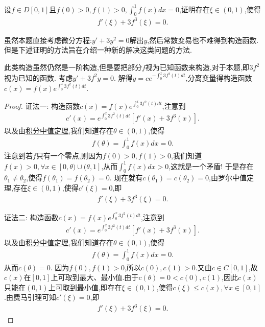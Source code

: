 \documentclass[../../main.tex]{subfiles}
\begin{document}
\begin{example}
设\(f\in D[0,1]\)且\(f(0)>0,f(1)>0,\int_{0}^{1} f(x)dx = 0\),证明存在\(\xi\in(0,1)\),使得
\begin{align*}
f'(\xi)+3f^{3}(\xi)=0.
\end{align*}
\end{example}
\begin{remark}
虽然本题直接考虑微分方程:$y'+3y^2=0$解出$y$,然后常数变易也不难得到构造函数.但是下述证明的方法旨在介绍一种新的解决这类问题的方法.
\end{remark}
\begin{note}
此类构造虽然仍然是一阶构造,但是要把部分\(f\)视为已知函数来构造,对于本题,即\(3f^{2}\)视为已知的函数. 考虑\(y'+3f^{2}y = 0\). 解得\(y = ce^{-\int_{0}^{x} 3f^{2}(t)dt}\),分离变量得构造函数\(c(x)=f(x)e^{\int_{0}^{x} 3f^{2}(t)dt}\).
\end{note}
\begin{proof}
{\color{blue}证法一:}
构造函数\(c(x)=f(x)e^{\int_{0}^{x} 3f^{2}(t)dt}\),注意到
\begin{align*}
c'(x)=e^{\int_{0}^{x} 3f^{2}(t)dt}[f'(x)+3f^{3}(x)].
\end{align*}
以及由\hyperref[theorem:积分中值定理]{积分中值定理},我们知道存在\(\theta\in(0,1)\),使得
\begin{align*}
f(\theta)=\int_{0}^{1} f(x)dx = 0.
\end{align*}
注意到若\(f\)只有一个零点,则因为\(f(0)>0,f(1)>0\),我们知道\(f(x)>0,\forall x\in[0,\theta)\cup(\theta,1]\),从而\(\int_{0}^{1} f(x)dx>0\),这就是一个矛盾!
于是存在\(\theta_1\neq\theta_2\),使得\(f(\theta_1)=f(\theta_2)=0\). 现在就有\(c(\theta_1)=c(\theta_2)=0\),由罗尔中值定理,存在\(\xi\in(0,1)\),使得\(c'(\xi)=0\),即
\begin{align*}
f'(\xi)+3f^{3}(\xi)=0.
\end{align*}

{\color{blue}证法二:}
构造函数\(c(x)=f(x)e^{\int_{0}^{x} 3f^{2}(t)dt}\),注意到
\begin{align*}
c'(x)=e^{\int_{0}^{x} 3f^{2}(t)dt}[f'(x)+3f^{3}(x)].
\end{align*}
以及由\hyperref[theorem:积分中值定理]{积分中值定理},我们知道存在\(\theta\in(0,1)\),使得
\begin{align*}
f(\theta)=\int_{0}^{1} f(x)dx = 0.
\end{align*}
从而$c(\theta)=0$.
因为$f(0),f(1)>0$,所以$c(0),c(1)>0$.又由$c\in C[0,1]$,故$c(x)$在$[0,1]$上可取到最大、最小值.由于$c(\theta)=0<c(0),c(1)$,因此$c(x)$只能在$(0,1)$上可取到最小值,即存在\(\xi\in(0,1)\),使得$c(\xi)\leq c(x),\forall x\in[0,1]$.由费马引理可知\(c'(\xi)=0\),即
\begin{align*}
f'(\xi)+3f^{3}(\xi)=0.
\end{align*}
\end{proof}
\end{document}
